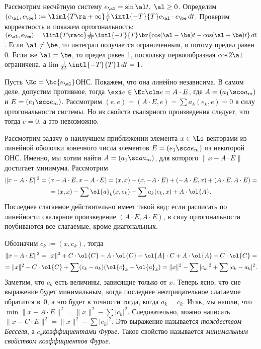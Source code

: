 \documentclass[a4paper]{article}
\begin{document}
Рассмотрим несчётную систему $e_\al = \sin \al t,\; \al \ge 0$. Определим $(e_\al,e_\be):=\liml{T
\ra +\infty} \frac{1}{T} \intl{-T}{T}e_\al \cdot e_\be \,d t$. Проверим корректность и покажем
ортогональность: $(e_\al,e_\be)=\liml{T \ra \infty}\frac{1}{2T}\intl{-T}{T}\br{\cos(\al-\be)t -
\cos (\al+\be)t}\,d t$. Если $\al \neq \be$, то интеграл получается ограниченным, и потому предел
равен 0. Если же $\al = \be$, то предел равен 1, поскольку первоообразная $\cos 2\al$ ограничена, а
$\lim\frac{1}{2T}\intl{-T}{T} 1 \,d t = 1$.

Пусть $\Ec = \hc{e_\al}$\т ОНС. Покажем, что она линейно независима. В самом деле,
допустим противное, тогда $\exi e \in \Ec\cln e = A \cdot E$, где $A = (a_1\sco a_m)$ и
$E = (e_1\sco e_m)$. Рассмотрим $(e,e) = (A \cdot E, e) = \sum a_k (e_k,e) =0$ в силу
ортогональности системы. Но из свойств скалярного произведения следует, что тогда
$e = 0$, а это невозможно.

Рассмотрим задачу о наилучшем приближении элемента $x \in \Ls$ векторами из линейной оболочки конечного
числа элементов $E = (e_1\sco e_m)$ из некоторой ОНС. Именно, мы хотим найти $A = (a_1\sco a_m)$, для которого
$\|x - A\cdot E\|$ достигает минимума.
Рассмотрим
\begin{multline*}
\|x - A \cdot E\|^2 = (x - A\cdot E, x - A\cdot E) = (x,x) + (x, -A\cdot E) + (-A\cdot E, x) +
(A\cdot E, A\cdot E) =\\= (x,x)-\sum \ol{a}_k(x,e_k) - \sum a_k (e_k,x) + A \cdot \ol{A}.
\end{multline*}
Последнее слагаемое действительно имеет такой вид: если расписать
по линейности скалярное произведение $(A\cdot E, A \cdot E)$, в силу ортогональности поубиваются все
слагаемые, кроме диагональных.

Обозначим $c_k := (x, e_k)$, тогда
\begin{multline*}
\|x - A\cdot E\|^2 = \|x\|^2 + C \cdot \ol{C} - A \cdot \ol{C} - \ol{A}\cdot C + A \cdot \ol{A} - C \cdot \ol{C}=\\=
\|x\|^2 - C \cdot \ol{C} + \sum (c_k -a_k)(\ol{c}_k -\ol{a}_k) = \|x\|^2 - \sum |c_k|^2 + \sum|c_k-a_k|^2.
\end{multline*}
Заметим, что $c_k$ есть величины,
зависящие только от $x$. Теперь ясно, что сие выражение будет минимальным, когда последнее
неотрицательное слагаемое обратится в~0, а это будет в точности тогда, когда $a_k = c_k$. Итак, мы
нашли, что $\min \|x-A\cdot E\|^2 = \|x\|^2 - \sum |c_k|^2$.
Следовательно, можно написать $\|x - C\cdot E\|^2 = \|x\|^2 - \sum |c_k|^2$. Это выражение
называется \emph{тождеством Бесселя}, а $c_k$\т \emph{коэффициентами Фурье}. Такое свойство
называется \emph{минимальным свойством коэффициентов Фурье}.
\end{document}
